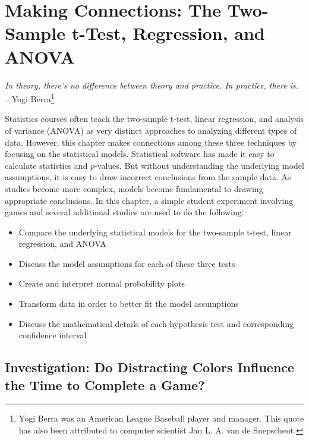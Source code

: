 \documentclass[
]{book}
\providecommand{\tightlist}{%
  \setlength{\itemsep}{0pt}\setlength{\parskip}{0pt}}
\begin{document}
\hypertarget{making-connections-the-two-sample-t-test-regression-and-anova}{%
\chapter{Making Connections: The Two-Sample t-Test, Regression, and ANOVA}\label{making-connections-the-two-sample-t-test-regression-and-anova}}

\begin{flushright}
\emph{In theory, there’s no difference between theory and practice. In practice, there is.} \\
-- Yogi Berra\footnote{Yogi Berra was an American League Baseball player and manager. This quote has also been attributed to computer scientist Jan L. A. van de Snepscheut.}
\end{flushright}

Statistics courses often teach the two-sample t-test, linear regression, and analysis of variance (ANOVA) as very distinct approaches to analyzing different types of data. However, this chapter makes connections among these three techniques by focusing on the statistical models. Statistical software has made it easy to calculate statistics and \(p\)-values. But without understanding the underlying model assumptions, it is easy to draw incorrect conclusions from the sample data. As studies become more complex, models become fundamental to drawing appropriate conclusions. In this chapter, a simple student experiment involving games and several additional studies are used to do the following:

\begin{itemize}
\tightlist
\item
  Compare the underlying statistical models for the two-sample t-test, linear regression, and
  ANOVA
\item
  Discuss the model assumptions for each of these three tests
\item
  Create and interpret normal probability plots
\item
  Transform data in order to better fit the model assumptions
\item
  Discuss the mathematical details of each hypothesis test and corresponding confidence interval
\end{itemize}

\newpage

\hypertarget{investigation-do-distracting-colors-influence-the-time-to-complete-a-game}{%
\section{Investigation: Do Distracting Colors Influence the Time to Complete a Game?}\label{investigation-do-distracting-colors-influence-the-time-to-complete-a-game}}
\end{document}
